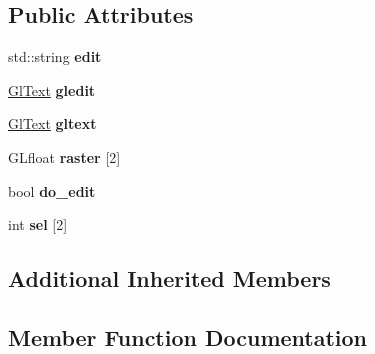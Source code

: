 \subsection*{Public Attributes}
\begin{DoxyCompactItemize}
\item 
std\+::string {\bfseries edit}\hypertarget{structpangolin_1_1_text_input_a7c43bd80c89d0b3819094c9da5c07ed7}{}\label{structpangolin_1_1_text_input_a7c43bd80c89d0b3819094c9da5c07ed7}

\item 
\hyperlink{classpangolin_1_1_gl_text}{Gl\+Text} {\bfseries gledit}\hypertarget{structpangolin_1_1_text_input_af5289e2ead9b59a5d3498478c6c33670}{}\label{structpangolin_1_1_text_input_af5289e2ead9b59a5d3498478c6c33670}

\item 
\hyperlink{classpangolin_1_1_gl_text}{Gl\+Text} {\bfseries gltext}\hypertarget{structpangolin_1_1_text_input_aa6e230140d88326e64b318870a9b35ec}{}\label{structpangolin_1_1_text_input_aa6e230140d88326e64b318870a9b35ec}

\item 
G\+Lfloat {\bfseries raster} \mbox{[}2\mbox{]}\hypertarget{structpangolin_1_1_text_input_a56759b64810ab00dea80bca2da47accd}{}\label{structpangolin_1_1_text_input_a56759b64810ab00dea80bca2da47accd}

\item 
bool {\bfseries do\+\_\+edit}\hypertarget{structpangolin_1_1_text_input_aefd15e802c99da15131edc87a4748d8c}{}\label{structpangolin_1_1_text_input_aefd15e802c99da15131edc87a4748d8c}

\item 
int {\bfseries sel} \mbox{[}2\mbox{]}\hypertarget{structpangolin_1_1_text_input_a687bcacda8b3bf0432202145bdd0c262}{}\label{structpangolin_1_1_text_input_a687bcacda8b3bf0432202145bdd0c262}

\end{DoxyCompactItemize}
\subsection*{Additional Inherited Members}


\subsection{Member Function Documentation}

